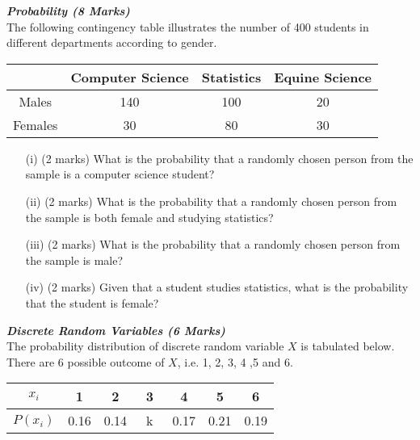 
\item[(b)] \textbf{\textit{Probability (8 Marks)}}\\ The following contingency table illustrates the number of 400 students in different
departments according to gender.

\begin{center}
\begin{tabular}{|c|c|c|c|}
  \hline
   & Computer Science & Statistics & Equine Science \\\hline
  Males & 140 & 100 & 20  \\  \hline
  Females & 30 & 80 & 30  \\ \hline

  \hline
\end{tabular}
\end{center}

\begin{itemize}
\item[(i)] (2 marks) What is the probability that a randomly chosen person from the sample is a
computer science student?
\item[(ii)] (2 marks) What is the probability that a randomly chosen person from the sample is both female and studying statistics?
\item[(iii)] (2 marks) What is the probability that a randomly chosen person from the sample is male?
\item[(iv)] (2 marks) Given that a student studies statistics, what is the probability that the student is female?
\end{itemize}
\item[(c)] \textbf{\textit{Discrete Random Variables (6 Marks)}}\\The probability distribution of discrete random variable $X$ is tabulated below. There are 6 possible outcome of $X$, i.e. 1, 2, 3, 4 ,5 and 6.
\begin{center}
\begin{tabular}{|c||c|c|c|c|c|c|}
\hline
$x_i$  & 1 & 2 & 3 & 4 & 5 & 6 \\\hline
$P(x_i)$ & 0.16 & 0.14 & \mbox{   k   } & 0.17 & 0.21 & 0.19\\
\hline
\end{tabular}
\end{center}

